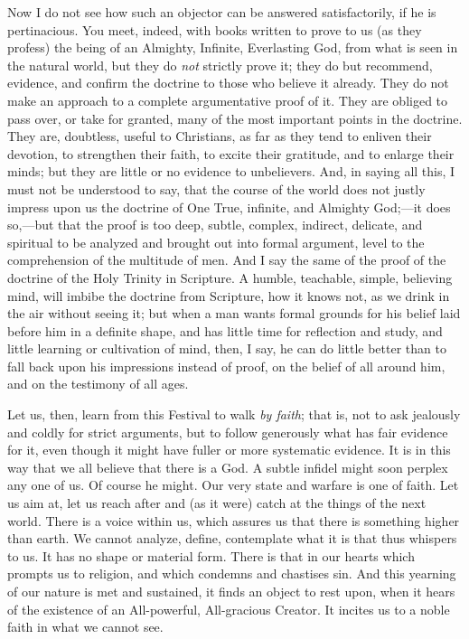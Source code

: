 Now I do not see how such an objector can be answered
satisfactorily, if he is pertinacious. You meet, indeed, with books
written to prove to us (as they profess) the being of an Almighty,
Infinite, Everlasting God, from what is seen in the natural world, but
they do \emph{not} strictly prove it; they do but recommend, evidence,
and confirm the doctrine to those who believe it already. They do not
make an approach to a complete argumentative proof of it. They are
obliged to pass over, or take for granted, many of the most important
points in the doctrine. They are, doubtless, useful to Christians, as
far as they tend to enliven their devotion, to strengthen their faith,
to excite their gratitude, and to enlarge their minds; but they are
little or no evidence to unbelievers. And, in saying all this, I must
not be understood to say, that the course of the world does not justly
impress upon us the doctrine of One True, infinite, and Almighty God;—it
does so,—but that the proof is too deep, subtle, complex, indirect,
delicate, and spiritual to be analyzed and brought out into formal
argument, level to the comprehension of the multitude of men. And I
say the same of the proof of the doctrine of the Holy Trinity in
Scripture. A humble, teachable, simple, believing mind, will imbibe
the doctrine from Scripture, how it knows not, as we drink in the air
without seeing it; but when a man wants formal grounds for his belief
laid before him in a definite shape, and has little time for
reflection and study, and little learning or cultivation of mind,
then, I say, he can do little better than to fall back upon his
impressions instead of proof, on the belief of all around him, and on
the testimony of all ages.

Let us, then, learn from this Festival to walk \emph{by faith};
that is, not to ask jealously and coldly for strict arguments, but to
follow generously what has fair evidence for it, even though it might
have fuller or more systematic evidence. It is in this way that we all
believe that there is a God. A subtle infidel might soon perplex any
one of us. Of course he might. Our very state and warfare is one of
faith. Let us aim at, let us reach after and (as it were) catch at the
things of the next world. There is a voice within us, which assures us
that there is something higher than earth. We cannot analyze, define,
contemplate what it is that thus whispers to us. It has no shape or
material form. There is that in our hearts which prompts us to
religion, and which condemns and chastises sin. And this yearning of
our nature is met and sustained, it finds an object to rest upon, when
it hears of the existence of an All-powerful, All-gracious Creator. It
incites us to a noble faith in what we cannot see.

